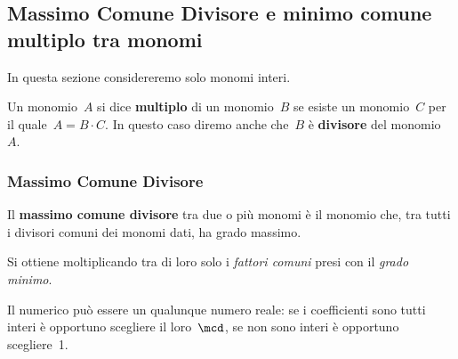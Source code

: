 
\subsection{Massimo Comune Divisore e minimo comune multiplo tra monomi}
\label{subsec:monomi_mcdemcm}

In questa sezione considereremo solo monomi interi.

\begin{definizione}{}{}
Un monomio~\(A\) si dice \textbf{multiplo} di un monomio~\(B\) se esiste
un monomio~\(C\) per il quale~\(A=B\cdot C\). 
In questo caso diremo anche che~\(B\) è \textbf{divisore} del monomio~\(A\).
\end{definizione}

\subsubsection{Massimo Comune Divisore}

\begin{definizione}{}{}
 Il \textbf{massimo comune divisore} tra due o più monomi è il
monomio che, tra tutti i divisori comuni dei monomi dati, ha grado
massimo.

Si ottiene moltiplicando tra di loro solo i \emph{fattori comuni} presi con 
il \emph{grado minimo}.
\end{definizione}

Il  numerico può essere un qualunque 
numero reale: se i coefficienti sono tutti interi è opportuno scegliere 
il loro~\(\mcd\), se non sono interi è opportuno scegliere~1.

% 
% 

% 
% 

